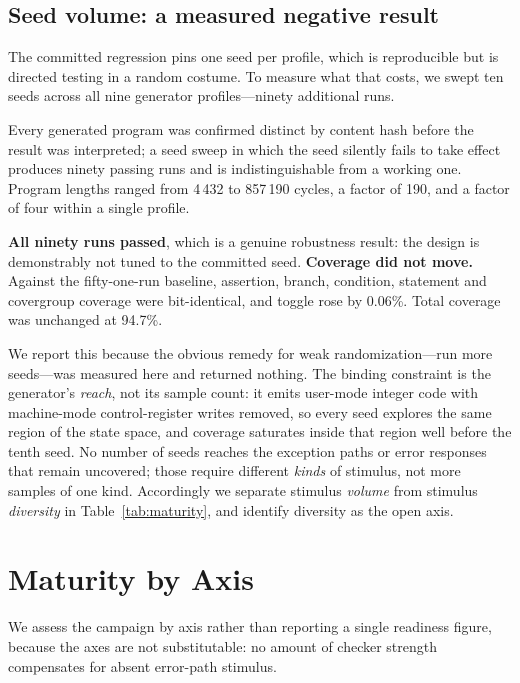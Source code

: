 \documentclass[conference]{IEEEtran}
\begin{document}
\subsection{Seed volume: a measured negative result}
\label{sec:seedfarm}

The committed regression pins one seed per profile, which is reproducible but
is directed testing in a random costume. To measure what that costs, we swept
ten seeds across all nine generator profiles---ninety additional runs.

Every generated program was confirmed distinct by content hash before the
result was interpreted; a seed sweep in which the seed silently fails to take
effect produces ninety passing runs and is indistinguishable from a working
one. Program lengths ranged from 4\,432 to 857\,190 cycles, a factor of 190,
and a factor of four within a single profile.

\textbf{All ninety runs passed}, which is a genuine robustness result: the
design is demonstrably not tuned to the committed seed. \textbf{Coverage did
not move.} Against the fifty-one-run baseline, assertion, branch, condition,
statement and covergroup coverage were bit-identical, and toggle rose by
0.06\%. Total coverage was unchanged at 94.7\%.

We report this because the obvious remedy for weak randomization---run more
seeds---was measured here and returned nothing. The binding constraint is the
generator's \emph{reach}, not its sample count: it emits user-mode integer code
with machine-mode control-register writes removed, so every seed explores the
same region of the state space, and coverage saturates inside that region well
before the tenth seed. No number of seeds reaches the exception paths or error
responses that remain uncovered; those require different \emph{kinds} of
stimulus, not more samples of one kind. Accordingly we separate stimulus
\emph{volume} from stimulus \emph{diversity} in Table~\ref{tab:maturity}, and
identify diversity as the open axis.

\section{Maturity by Axis}
\label{sec:maturity}

We assess the campaign by axis rather than reporting a single readiness
figure, because the axes are not substitutable: no amount of checker
strength compensates for absent error-path stimulus.
\end{document}
